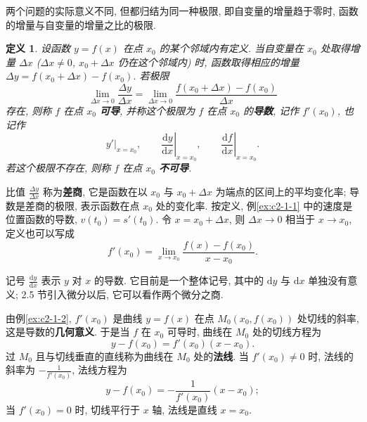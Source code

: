 \documentclass[UTF8,openany]{ctexbook}
\theoremstyle{chinesetextbook}
\newtheorem{definition}{定义}[section]
\newcommand{\dd}{\mathrm d}
\begin{document}
\begin{center}
\end{center}

两个问题的实际意义不同, 但都归结为同一种极限, 即自变量的增量趋于零时, 函数的增量与自变量的增量之比的极限.
\begin{definition}
设函数 $y=f(x)$ 在点 $x_0$ 的某个邻域内有定义. 当自变量在 $x_0$ 处取得增量 $\Delta x$ ($\Delta x\ne0$, $x_0+\Delta x$ 仍在这个邻域内) 时, 函数取得相应的增量 $\Delta y=f(x_0+\Delta x)-f(x_0)$. 若极限
\[
\lim_{\Delta x\to0}\frac{\Delta y}{\Delta x}=\lim_{\Delta x\to0}\frac{f(x_0+\Delta x)-f(x_0)}{\Delta x}
\]
存在, 则称 $f$ 在点 $x_0$ \textbf{可导}, 并称这个极限为 $f$ 在点 $x_0$ 的\textbf{导数}, 记作 $f'(x_0)$, 也记作
\[
y'\big|_{x=x_0},\qquad\left.\frac{\dd y}{\dd x}\right|_{x=x_0},\qquad\left.\frac{\dd f}{\dd x}\right|_{x=x_0}.
\]
若这个极限不存在, 则称 $f$ 在点 $x_0$ \textbf{不可导}.
\end{definition}
比值 $\displaystyle\frac{\Delta y}{\Delta x}$ 称为\textbf{差商}, 它是函数在以 $x_0$ 与 $x_0+\Delta x$ 为端点的区间上的平均变化率; 导数是差商的极限, 表示函数在点 $x_0$ 处的变化率. 按定义, 例\ref{ex:c2-1-1} 中的速度是位置函数的导数, $v(t_0)=s'(t_0)$. 令 $x=x_0+\Delta x$, 则 $\Delta x\to0$ 相当于 $x\to x_0$, 定义也可以写成
\[
f'(x_0)=\lim_{x\to x_0}\frac{f(x)-f(x_0)}{x-x_0}.
\]

记号 $\displaystyle\frac{\dd y}{\dd x}$ 表示 $y$ 对 $x$ 的导数. 它目前是一个整体记号, 其中的 $\dd y$ 与 $\dd x$ 单独没有意义; 2.5 节引入微分以后, 它可以看作两个微分之商.

由例\ref{ex:c2-1-2}, $f'(x_0)$ 是曲线 $y=f(x)$ 在点 $M_0(x_0,f(x_0))$ 处切线的斜率, 这是导数的\textbf{几何意义}. 于是当 $f$ 在 $x_0$ 可导时, 曲线在 $M_0$ 处的切线方程为
\[
y-f(x_0)=f'(x_0)(x-x_0).
\]
过 $M_0$ 且与切线垂直的直线称为曲线在 $M_0$ 处的\textbf{法线}. 当 $f'(x_0)\ne0$ 时, 法线的斜率为 $\displaystyle-\frac1{f'(x_0)}$, 法线方程为
\[
y-f(x_0)=-\frac1{f'(x_0)}(x-x_0);
\]
当 $f'(x_0)=0$ 时, 切线平行于 $x$ 轴, 法线是直线 $x=x_0$.
\end{document}
